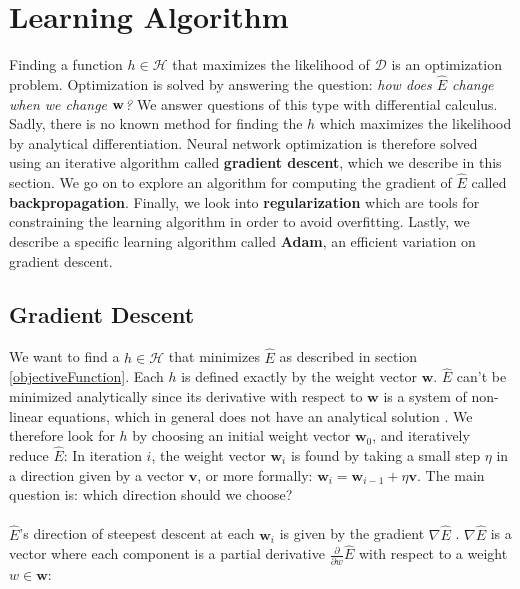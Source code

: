 \section{Learning Algorithm}
\label{learningAlgorithm}
Finding a function $h \in \mathcal{H}$ that maximizes the likelihood of $\mathcal{D}$ is an optimization problem. Optimization is solved by answering the question: \textit{how does $\hat{E}$ change when we change $\mathbf{w}$?} We answer questions of this type with differential calculus. Sadly, there is no known method for finding the $h$ which maximizes the likelihood by analytical differentiation. Neural network optimization is therefore solved using an iterative algorithm called \textbf{gradient descent}, which we describe in this section. We go on to explore an algorithm for computing the gradient of $\hat{E}$ called \textbf{backpropagation}. Finally, we look into \textbf{regularization} which are tools for constraining the learning algorithm in order to avoid overfitting. Lastly, we describe a specific learning algorithm called \textbf{Adam}, an efficient variation on gradient descent.

\subsection{Gradient Descent}
\label{gradient_descent}
We want to find a $h \in \mathcal{H}$ that minimizes $\hat{E}$ as described in section \ref{objectiveFunction}. Each $h$ is defined exactly by the weight vector $\mathbf{w}$. $\hat{E}$ can't be minimized analytically since its derivative with respect to $\mathbf{w}$ is a system of non-linear equations, which in general does not have an analytical solution \citep{goodfellow16}. We therefore look for $h$ by choosing an initial weight vector $\mathbf{w}_0$, and iteratively reduce $\hat{E}$: In iteration $i$, the weight vector $\mathbf{w}_i$ is found by taking a small step $\eta$ in a direction given by a vector $\mathbf{v}$, or more formally: $\mathbf{w}_i = \mathbf{w}_{i-1} + \eta\mathbf{v}$. The main question is: which direction should we choose? 
\\\\ 
$\hat{E}$'s direction of steepest descent at each $\mathbf{w}_i$ is given by the gradient $\nabla\hat{E}$ \citep{yaser12}. $\nabla \hat{E}$ is a vector where each component is a partial derivative $\frac{\partial}{\partial w}\hat{E}$ with respect to a weight $w \in \mathbf{w}$:

